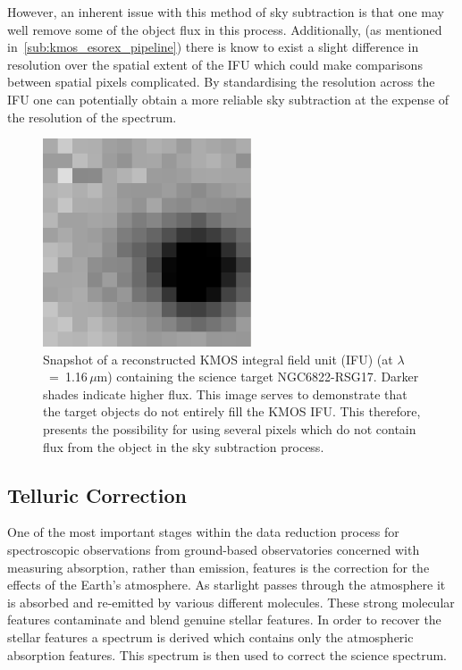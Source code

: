 However, an inherent issue with this method of sky subtraction is that one may well remove some of the object flux in this process.
Additionally, (as mentioned in~\ref{sub:kmos_esorex_pipeline}) there is know to exist a slight difference in resolution over the spatial extent of the IFU which could make comparisons between spatial pixels complicated.
By standardising the resolution across the IFU one can potentially obtain a more reliable sky subtraction at the expense of the resolution of the spectrum.


\begin{figure}
 \centering
\includegraphics[width=0.55\textwidth]{ngc6822/N6822_RSG17-snapshot}
 \caption[Snapshot of a KMOS integral field unit]{
          Snapshot of a reconstructed KMOS integral field unit (IFU) (at $\lambda$~=~1.16\,$\mu$m) containing the science target NGC6822-RSG17.
          Darker shades indicate higher flux.
          This image serves to demonstrate that the target objects do not entirely fill the KMOS IFU.
          This therefore, presents the possibility for using several pixels which do not contain flux from the object in the sky subtraction process.
          }
 \label{fig:IFU_snapshot}
\end{figure}


\subsection{Telluric Correction} %
\label{sub:telluric_correction}

One of the most important stages within the data reduction process for spectroscopic observations from ground-based observatories concerned with measuring absorption, rather than emission, features is the correction for the effects of the Earth's atmosphere.
As starlight passes through the atmosphere it is absorbed and re-emitted by various different molecules.
These strong molecular features contaminate and blend genuine stellar features.
In order to recover the stellar features a spectrum is derived which contains only the atmospheric absorption features.
This spectrum is then used to correct the science spectrum.

